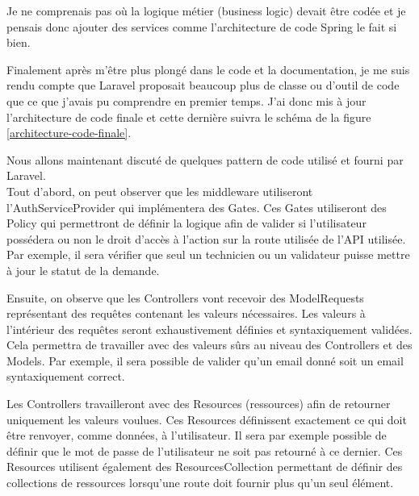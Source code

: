 \documentclass[
    iai, %
    il, %
]{heig-tb}
\begin{document}


Je ne comprenais pas où la logique métier (business logic) devait être codée et je pensais donc
ajouter des services comme l'architecture de code Spring le fait si bien. %


Finalement après m'être plus plongé dans le code et la documentation, je me suis rendu compte que
Laravel proposait beaucoup plus de classe ou d'outil de code que ce que j'avais pu comprendre en
premier temps. J'ai donc mis à jour l'architecture de code finale et cette dernière suivra le schéma
de la figure \ref{architecture-code-finale}.

Nous allons maintenant discuté de quelques pattern de code utilisé et fourni par Laravel.\\
Tout d'abord, on peut observer que les middleware utiliseront l'AuthServiceProvider qui
implémentera des Gates. Ces Gates utiliseront des Policy qui permettront de définir la logique afin
de valider si l'utilisateur possédera ou non le droit d'accès à l'action sur la route utilisée de
l'API utilisée. Par exemple, il sera vérifier que seul un technicien ou un validateur puisse mettre
à jour le statut de la demande.

Ensuite, on observe que les Controllers vont recevoir des ModelRequests représentant des requêtes
contenant les valeurs nécessaires. Les valeurs à l'intérieur des requêtes seront exhaustivement
définies et syntaxiquement validées. Cela permettra de travailler avec des valeurs sûrs au niveau
des Controllers et des Models. Par exemple, il sera possible de valider qu'un email donné soit un
email syntaxiquement correct.

Les Controllers travailleront avec des Resources (ressources) afin de retourner uniquement les
valeurs voulues. Ces Resources définissent exactement ce qui doit être renvoyer, comme données, à
l'utilisateur. Il sera par exemple possible de définir que le mot de passe de l'utilisateur ne soit
pas retourné à ce dernier. Ces Resources utilisent également des ResourcesCollection permettant de
définir des collections de ressources lorsqu'une route doit fournir plus qu'un seul élément.
\end{document}
